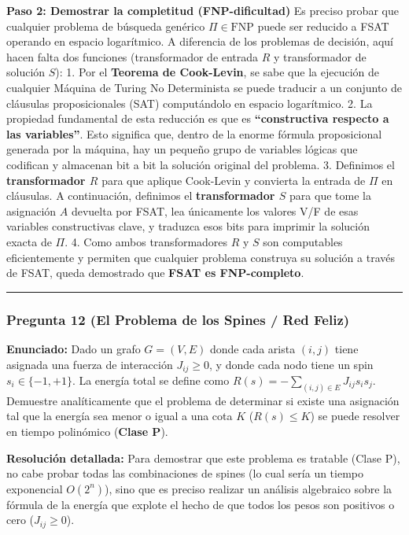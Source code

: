 \documentclass[12pt]{book} %
\begin{document}
\textbf{Paso 2: Demostrar la completitud (FNP-dificultad)} Es preciso
probar que cualquier problema de búsqueda genérico
\(\Pi \in \text{FNP}\) puede ser reducido a FSAT operando en espacio
logarítmico. A diferencia de los problemas de decisión, aquí hacen falta
dos funciones (transformador de entrada \(R\) y transformador de
solución \(S\)): 1. Por el \textbf{Teorema de Cook-Levin}, se sabe que
la ejecución de cualquier Máquina de Turing No Determinista se puede
traducir a un conjunto de cláusulas proposicionales (SAT) computándolo
en espacio logarítmico. 2. La propiedad fundamental de esta reducción es
que es \textbf{``constructiva respecto a las variables''}. Esto
significa que, dentro de la enorme fórmula proposicional generada por la
máquina, hay un pequeño grupo de variables lógicas que codifican y
almacenan bit a bit la solución original del problema. 3. Definimos el
\textbf{transformador \(R\)} para que aplique Cook-Levin y convierta la
entrada de \(\Pi\) en cláusulas. A continuación, definimos el
\textbf{transformador \(S\)} para que tome la asignación \(A\) devuelta
por FSAT, lea únicamente los valores V/F de esas variables constructivas
clave, y traduzca esos bits para imprimir la solución exacta de \(\Pi\).
4. Como ambos transformadores \(R\) y \(S\) son computables
eficientemente y permiten que cualquier problema construya su solución a
través de FSAT, queda demostrado que \textbf{FSAT es FNP-completo}.

\begin{center}\rule{0.5\linewidth}{0.5pt}\end{center}

\hypertarget{pregunta-12-el-problema-de-los-spines-red-feliz}{%
\subsubsection{Pregunta 12 (El Problema de los Spines / Red
Feliz)}\label{pregunta-12-el-problema-de-los-spines-red-feliz}}

\textbf{Enunciado:} Dado un grafo \(G = (V, E)\) donde cada arista
\((i,j)\) tiene asignada una fuerza de interacción \(J_{ij} \ge 0\), y
donde cada nodo tiene un spin \(s_i \in \{-1, +1\}\). La energía total
se define como \(R(s) = -\sum_{(i,j)\in E} J_{ij} s_i s_j\). Demuestre
analíticamente que el problema de determinar si existe una asignación
tal que la energía sea menor o igual a una cota \(K\) (\(R(s) \le K\))
se puede resolver en tiempo polinómico (\textbf{Clase P}).

\textbf{Resolución detallada:} Para demostrar que este problema es
tratable (Clase P), no cabe probar todas las combinaciones de spines (lo
cual sería un tiempo exponencial \(O(2^n)\)), sino que es preciso
realizar un análisis algebraico sobre la fórmula de la energía que
explote el hecho de que todos los pesos son positivos o cero
(\(J_{ij} \ge 0\)).
\end{document}
